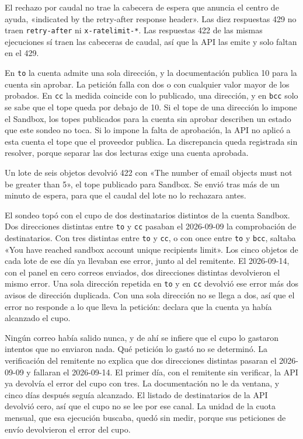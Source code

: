 El rechazo por caudal no trae la cabecera de espera que anuncia el centro de ayuda,
«indicated by the retry-after response header». Las diez respuestas 429 no traen
\texttt{retry-after} ni \texttt{x-ratelimit-*}. Las respuestas 422 de las mismas
ejecuciones sí traen las cabeceras de caudal, así que la API las emite y solo faltan
en el 429.

En \texttt{to} la cuenta admite una sola dirección, y la documentación publica 10 para
la cuenta sin aprobar. La petición falla con dos o con cualquier valor mayor de los
probados. En \texttt{cc} la medida
coincide con lo publicado, una dirección, y en \texttt{bcc} solo se sabe que el tope
queda por debajo de 10. Si el tope de una dirección lo impone el Sandbox, los topes
publicados para la cuenta sin aprobar describen un estado que este sondeo no toca. Si
lo impone la falta de aprobación, la API no aplicó a esta cuenta el tope que el
proveedor publica. La discrepancia queda registrada sin resolver, porque separar las
dos lecturas exige una cuenta aprobada.

Un lote de seis objetos devolvió 422 con «The number of email objects must not be
greater than 5», el tope publicado para Sandbox. Se envió tras más de un minuto de
espera, para que el caudal del lote no lo rechazara antes.

El sondeo topó con el cupo de dos destinatarios distintos de la cuenta Sandbox. Dos
direcciones distintas entre \texttt{to} y \texttt{cc} pasaban el 2026-09-09 la
comprobación de destinatarios. Con tres distintas entre \texttt{to} y \texttt{cc}, o
con once entre \texttt{to} y \texttt{bcc}, saltaba «You have reached sandbox account
unique recipients limit». Los cinco objetos de cada lote de ese día ya llevaban ese
error, junto al del remitente. El 2026-09-14, con el panel en cero correos enviados,
dos direcciones distintas devolvieron el mismo error. Una sola dirección repetida en
\texttt{to} y en \texttt{cc} devolvió ese error más dos avisos de dirección duplicada.
Con una sola dirección no se llega a dos, así que el error no responde a lo que lleva
la petición: declara que la cuenta ya había alcanzado el cupo.

Ningún correo había salido nunca, y de ahí se infiere que el cupo lo gastaron intentos
que no enviaron nada. Qué petición lo gastó no se determinó. La verificación del
remitente no explica que dos direcciones distintas pasaran el 2026-09-09 y fallaran el
2026-09-14. El primer día, con el remitente sin verificar, la API ya devolvía el error
del cupo con tres. La documentación no le da ventana, y cinco días después seguía
alcanzado. El listado de destinatarios de la API devolvió cero, así que el cupo no se
lee por ese canal. La unidad de la cuota mensual, que esa ejecución buscaba, quedó sin
medir, porque sus peticiones de envío devolvieron el error del cupo.

